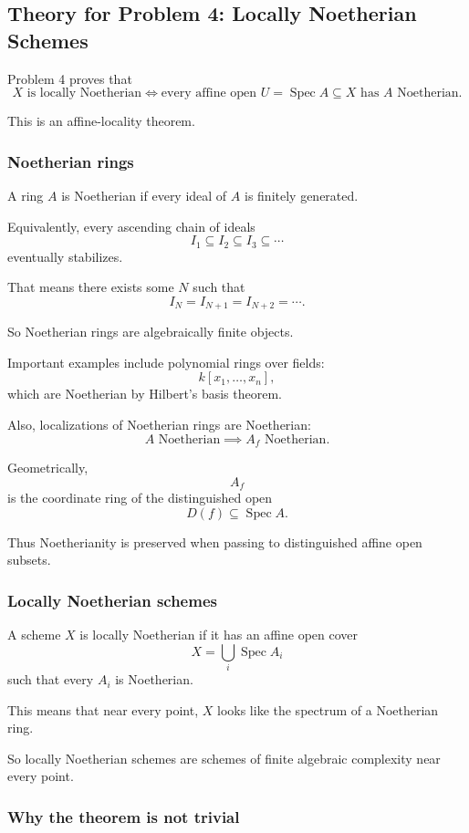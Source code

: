 \documentclass[12pt,a4paper]{article}
\DeclareMathOperator{\Spec}{Spec}
\providecommand{\Spec}{\operatorname{Spec}}
\theoremstyle{notespace}
\begin{document}
\subsection{Theory for Problem 4: Locally Noetherian Schemes}

Problem 4 proves that
\[
\boxed{
	X\text{ is locally Noetherian}
	\iff
	\text{every affine open }U=\Spec A\subseteq X\text{ has }A\text{ Noetherian}.
}
\]

This is an affine-locality theorem.

\subsubsection*{Noetherian rings}

A ring \(A\) is Noetherian if every ideal of \(A\) is finitely generated.

Equivalently, every ascending chain of ideals
\[
I_1\subseteq I_2\subseteq I_3\subseteq \cdots
\]
eventually stabilizes.

That means there exists some \(N\) such that
\[
I_N=I_{N+1}=I_{N+2}=\cdots.
\]

So Noetherian rings are algebraically finite objects.

Important examples include polynomial rings over fields:
\[
k[x_1,\dots,x_n],
\]
which are Noetherian by Hilbert's basis theorem.

Also, localizations of Noetherian rings are Noetherian:
\[
A\text{ Noetherian}
\implies
A_f\text{ Noetherian}.
\]

Geometrically,
\[
A_f
\]
is the coordinate ring of the distinguished open
\[
D(f)\subseteq \Spec A.
\]

Thus Noetherianity is preserved when passing to distinguished affine open subsets.

\subsubsection*{Locally Noetherian schemes}

A scheme \(X\) is locally Noetherian if it has an affine open cover
\[
X=\bigcup_i \Spec A_i
\]
such that every \(A_i\) is Noetherian.

This means that near every point, \(X\) looks like the spectrum of a Noetherian ring.

So locally Noetherian schemes are schemes of finite algebraic complexity near every point.

\subsubsection*{Why the theorem is not trivial}
\end{document}
